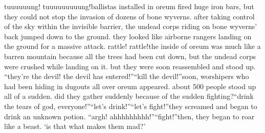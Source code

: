 tuuuuuung! tuuuuuuuuung!ballistas installed in oreum fired huge iron bars, but they could not stop the invasion of dozens of bone wyverns.
 after taking control of the sky within the invisible barrier, the undead corps riding on bone wyverns’ back jumped down to the ground.
 they looked like airborne rangers landing on the ground for a massive attack.
rattle! rattle!the inside of oreum was much like a barren mountain because all the trees had been cut down, but the undead corps were crushed while landing on it.
 but they were soon reassembled and stood up.
“they’re the devil! the devil has entered!”“kill the devil!”soon, worshipers who had been hiding in dugouts all over oreum appeared.
about 500 people stood up all of a sudden.
 did they gather suddenly because of the sudden fighting?“drink the tears of god, everyone!”“let’s drink!”“let’s fight!”they screamed and began to drink an unknown potion.
“argh! ahhhhhhhhh!”“fight!”then, they began to roar like a beast.
‘is that what makes them mad?’

 